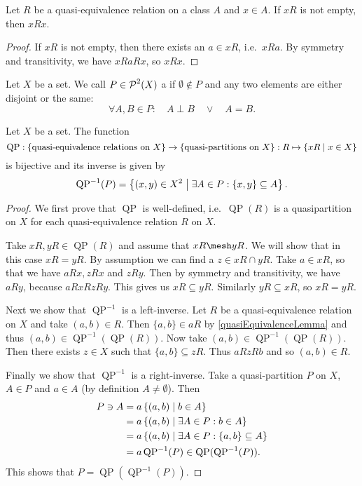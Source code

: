 \begin{lemma} \label{quasiEquivalenceLemma}
Let $R$ be a quasi-equivalence relation on a class $A$ and $x\in A$. If $xR$ is not empty, then $xRx$.
\end{lemma}
\begin{proof}
If $xR$ is not empty, then there exists an $a\in xR$, i.e.\ $xRa$. By symmetry and transitivity, we have $xRaRx$, so $xRx$.
\end{proof}

\begin{definition}
Let $X$ be a set. We call $P\in\operatorname{\mathcal{P}}^2(X)$ a  if $\emptyset\notin P$ and any two elements are either disjoint or the same:
\[ \forall A,B\in P: \quad A\perp B \quad\lor\quad A=B. \]
\end{definition}

\begin{proposition}
Let $X$ be a set. The function
\[ \operatorname{QP}: \{\text{quasi-equivalence relations on $X$}\} \to \{\text{quasi-partitions on $X$}\}: R\mapsto \left\{ xR \;\middle|\; x\in X \right\} \]
is bijective and its inverse is given by
\[ \operatorname{QP}^{-1}(P) = \left\{ (x,y)\in X^2 \;\middle|\; \exists A\in P: \{x,y\}\subseteq A \right\}. \]
\end{proposition}
\begin{proof}
We first prove that $\operatorname{QP}$ is well-defined, i.e.\ $\operatorname{QP}(R)$ is a quasipartition on $X$ for each quasi-equivalence relation $R$ on $X$.

Take $xR,yR\in \operatorname{QP}(R)$ and assume that $xR\mesh yR$. We will show that in this case $xR = yR$. By assumption we can find a $z\in xR\cap yR$. Take $a\in xR$, so that we have $aRx, zRx$ and $zRy$. Then by symmetry and transitivity, we have $aRy$, because $aRxRzRy$. This gives us $xR\subseteq yR$. Similarly $yR\subseteq xR$, so $xR=yR$.

Next we show that $\operatorname{QP}^{-1}$ is a left-inverse.
Let $R$ be a quasi-equivalence relation on $X$ and take $(a,b)\in R$. Then $\{a,b\}\in aR$ by \ref{quasiEquivalenceLemma} and thus $(a,b)\in \operatorname{QP}^{-1}(\operatorname{QP}(R))$.
Now take $(a,b)\in \operatorname{QP}^{-1}(\operatorname{QP}(R))$. Then there exists $z\in X$ such that $\{a,b\}\subseteq zR$. Thus $aRzRb$ and so $(a,b)\in R$.

Finally we show that $\operatorname{QP}^{-1}$ is a right-inverse. Take a quasi-partition $P$ on $X$, $A\in P$ and $a\in A$ (by definition $A\neq \emptyset$). Then
\begin{align*}
P \ni A &= a\left\{ (a,b) \;\middle|\; b\in A \right\} \\
&= a\left\{ (a,b) \;\middle|\; \exists A\in P: b\in A \right\} \\
&= a\left\{ (a,b) \;\middle|\; \exists A\in P: \{a,b\}\subseteq A \right\} \\
&= a\operatorname{QP}^{-1}(P) \in \operatorname{QP}(\operatorname{QP}^{-1}(P)).
\end{align*}
This shows that $P = \operatorname{QP}(\operatorname{QP}^{-1}(P))$.
\end{proof}

